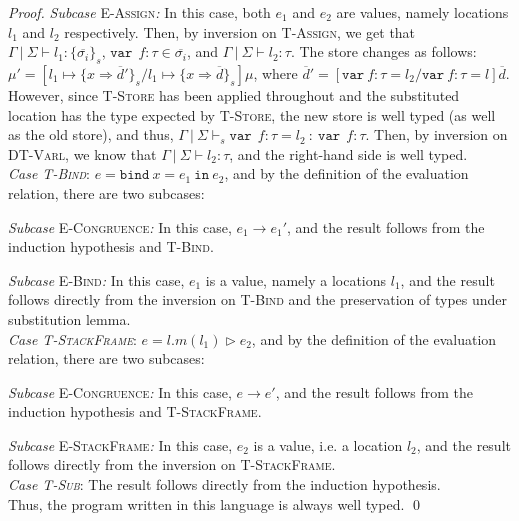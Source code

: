 \documentclass{llncs}
\newcommand{\keywadj}[1]{\mathtt{#1}}
\newcommand{\keyw}[1]{\keywadj{#1}~}
\begin{document}
\begin{proof}
\textit{Subcase} \textsc{E-Assign}\textit{:} In this case, both $e_1$ and $e_2$ are values, namely locations $l_1$ and $l_2$ respectively. Then, by inversion on \textsc{T-Assign}, we get that $\Gamma~|~\Sigma \vdash l_1 : \{ \overline{\sigma_i} \}_s$, $\keyw{var}~ f : \tau \in \overline{\sigma_i}$, and $\Gamma~|~\Sigma \vdash l_2 : \tau$. The store changes as follows: $\mu' = [l_1 \mapsto \{ x \Rightarrow \overline{d}' \}_{s}/l_1 \mapsto \{ x \Rightarrow \overline{d} \}_{s}]\mu$, where $\overline{d}' = [\keyw{var} f:\tau = l_2/\keyw{var} f : \tau = l]\overline{d}$. However, since \textsc{T-Store} has been applied throughout and the substituted location has the type expected by \textsc{T-Store}, the new store is well typed (as well as the old store), and thus, \mbox{$\Gamma~|~\Sigma \vdash_s \keyw{var}~ f : \tau = l_2~:~\keyw{var}~ f : \tau$}. Then, by inversion on \textsc{DT-Varl}, we know that $\Gamma~|~\Sigma \vdash l_2 : \tau$, and the right-hand side is well typed.
\\

\noindent\textit{Case \textsc{T-Bind}}:
$e = \keyw{bind} x = e_1~\keyw{in} e_2$, and by the definition of the evaluation relation, there are two subcases:

\textit{Subcase} \textsc{E-Congruence}\textit{:} In this case, $e_1 \longrightarrow e_1'$, and the result follows from the induction hypothesis and \textsc{T-Bind}.

\textit{Subcase} \textsc{E-Bind}\textit{:} In this case, $e_1$ is a value, namely a locations $l_1$, and the result follows directly from the inversion on \textsc{T-Bind} and the preservation of types under substitution lemma.
\\

\noindent\textit{Case \textsc{T-StackFrame}}:
$e = l.m(l_1) \rhd e_2$, and by the definition of the evaluation relation, there are two subcases:

\textit{Subcase} \textsc{E-Congruence}\textit{:} In this case, $e \longrightarrow e'$, and the result follows from the induction hypothesis and \textsc{T-StackFrame}.

\textit{Subcase} \textsc{E-StackFrame}\textit{:} In this case, $e_2$ is a value, i.e. a location $l_2$, and the result follows directly from the inversion on \textsc{T-StackFrame}.
\\

\noindent\textit{Case \textsc{T-Sub}}:
The result follows directly from the induction hypothesis.
\\

\noindent Thus, the program written in this language is always well typed. \qed

\end{proof}
\end{document}
